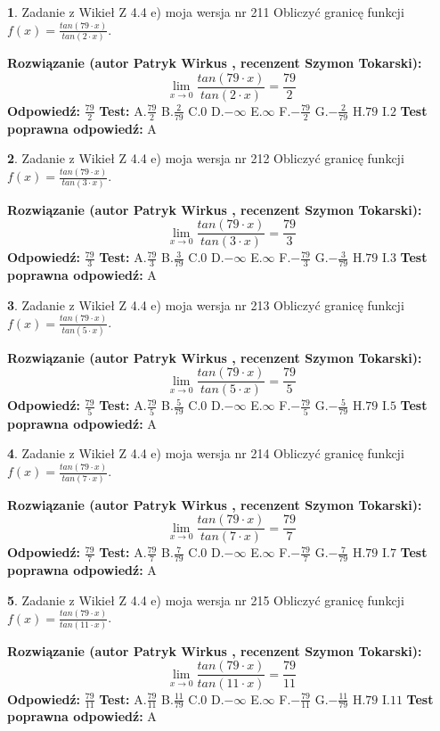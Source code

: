 \documentclass[12pt, a4paper]{article}
\theoremstyle{definition} %
\newtheorem{zad}{}
\newcommand{\zadStart}[1]{\begin{zad}#1\newline}
\newcommand{\zadStop}{\end{zad}}
\newcommand{\rozwStart}[2]{\noindent \textbf{Rozwiązanie (autor #1 , recenzent #2): }\newline}
\newcommand{\rozwStop}{\newline}
\newcommand{\odpStart}{\noindent \textbf{Odpowiedź:}\newline}
\newcommand{\odpStop}{\newline}
\newcommand{\testStart}{\noindent \textbf{Test:}\newline}
\newcommand{\testStop}{\newline}
\newcommand{\kluczStart}{\noindent \textbf{Test poprawna odpowiedź:}\newline}
\newcommand{\kluczStop}{\newline}
\begin{document}
\zadStart{Zadanie z Wikieł Z 4.4 e) moja wersja nr 211}
Obliczyć granicę funkcji $f(x)=\frac{tan(79\cdot x)}{tan(2\cdot x)}$.
\zadStop
\rozwStart{Patryk Wirkus}{Szymon Tokarski}
$$\lim\limits_{x\to 0}\frac{tan(79\cdot x)}{tan(2\cdot x)}=
\frac{79}{2}$$
\rozwStop
\odpStart
$\frac{79}{2}$
\odpStop
\testStart
A.$\frac{79}{2}$
B.$\frac{2}{79}$
C.$0$
D.$-\infty$
E.$\infty$
F.$-\frac{79}{2}$
G.$-\frac{2}{79}$
H.$79$
I.$2$
\testStop
\kluczStart
A
\kluczStop



\zadStart{Zadanie z Wikieł Z 4.4 e) moja wersja nr 212}
Obliczyć granicę funkcji $f(x)=\frac{tan(79\cdot x)}{tan(3\cdot x)}$.
\zadStop
\rozwStart{Patryk Wirkus}{Szymon Tokarski}
$$\lim\limits_{x\to 0}\frac{tan(79\cdot x)}{tan(3\cdot x)}=
\frac{79}{3}$$
\rozwStop
\odpStart
$\frac{79}{3}$
\odpStop
\testStart
A.$\frac{79}{3}$
B.$\frac{3}{79}$
C.$0$
D.$-\infty$
E.$\infty$
F.$-\frac{79}{3}$
G.$-\frac{3}{79}$
H.$79$
I.$3$
\testStop
\kluczStart
A
\kluczStop



\zadStart{Zadanie z Wikieł Z 4.4 e) moja wersja nr 213}
Obliczyć granicę funkcji $f(x)=\frac{tan(79\cdot x)}{tan(5\cdot x)}$.
\zadStop
\rozwStart{Patryk Wirkus}{Szymon Tokarski}
$$\lim\limits_{x\to 0}\frac{tan(79\cdot x)}{tan(5\cdot x)}=
\frac{79}{5}$$
\rozwStop
\odpStart
$\frac{79}{5}$
\odpStop
\testStart
A.$\frac{79}{5}$
B.$\frac{5}{79}$
C.$0$
D.$-\infty$
E.$\infty$
F.$-\frac{79}{5}$
G.$-\frac{5}{79}$
H.$79$
I.$5$
\testStop
\kluczStart
A
\kluczStop



\zadStart{Zadanie z Wikieł Z 4.4 e) moja wersja nr 214}
Obliczyć granicę funkcji $f(x)=\frac{tan(79\cdot x)}{tan(7\cdot x)}$.
\zadStop
\rozwStart{Patryk Wirkus}{Szymon Tokarski}
$$\lim\limits_{x\to 0}\frac{tan(79\cdot x)}{tan(7\cdot x)}=
\frac{79}{7}$$
\rozwStop
\odpStart
$\frac{79}{7}$
\odpStop
\testStart
A.$\frac{79}{7}$
B.$\frac{7}{79}$
C.$0$
D.$-\infty$
E.$\infty$
F.$-\frac{79}{7}$
G.$-\frac{7}{79}$
H.$79$
I.$7$
\testStop
\kluczStart
A
\kluczStop



\zadStart{Zadanie z Wikieł Z 4.4 e) moja wersja nr 215}
Obliczyć granicę funkcji $f(x)=\frac{tan(79\cdot x)}{tan(11\cdot x)}$.
\zadStop
\rozwStart{Patryk Wirkus}{Szymon Tokarski}
$$\lim\limits_{x\to 0}\frac{tan(79\cdot x)}{tan(11\cdot x)}=
\frac{79}{11}$$
\rozwStop
\odpStart
$\frac{79}{11}$
\odpStop
\testStart
A.$\frac{79}{11}$
B.$\frac{11}{79}$
C.$0$
D.$-\infty$
E.$\infty$
F.$-\frac{79}{11}$
G.$-\frac{11}{79}$
H.$79$
I.$11$
\testStop
\kluczStart
A
\kluczStop
\end{document}
